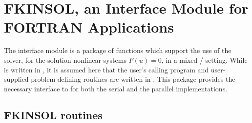 \chapter{FKINSOL, an Interface Module for FORTRAN Applications}\label{s:fcmix}

The {\fkinsol} interface module is a package of {\C} functions which support
the use of the {\kinsol} solver, for the solution nonlinear systems
$F(u)=0$, in a mixed {\F}/{\C} setting.  While {\kinsol} is written
in {\C}, it is assumed here that the user's calling program and
user-supplied problem-defining routines are written in {\F}.
This package provides the necessary interface to {\kinsol} for both the
serial and the parallel {\nvector} implementations.

\section{FKINSOL routines}\label{sss:fkinroutines}

